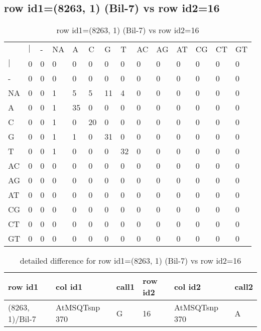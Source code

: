 \subsection{row id1=(8263, 1) (Bil-7) vs row id2=16}
\begin{center}
\begin{longtable}{|l|l|l|l|l|l|l|l|l|l|l|l|l|l|}
\caption{row id1=(8263, 1) (Bil-7) vs row id2=16} \label{table_dm412}\\
\hline
\\
\hline
&$|$&-&NA&A&C&G&T&AC&AG&AT&CG&CT&GT\\
$|$&0&0&0&0&0&0&0&0&0&0&0&0&0\\
-&0&0&0&0&0&0&0&0&0&0&0&0&0\\
NA&0&0&1&5&5&11&4&0&0&0&0&0&0\\
A&0&0&1&35&0&0&0&0&0&0&0&0&0\\
C&0&0&1&0&20&0&0&0&0&0&0&0&0\\
G&0&0&1&1&0&31&0&0&0&0&0&0&0\\
T&0&0&1&0&0&0&32&0&0&0&0&0&0\\
AC&0&0&0&0&0&0&0&0&0&0&0&0&0\\
AG&0&0&0&0&0&0&0&0&0&0&0&0&0\\
AT&0&0&0&0&0&0&0&0&0&0&0&0&0\\
CG&0&0&0&0&0&0&0&0&0&0&0&0&0\\
CT&0&0&0&0&0&0&0&0&0&0&0&0&0\\
GT&0&0&0&0&0&0&0&0&0&0&0&0&0\\
\hline
\end{longtable}
\end{center}

\begin{center}
\begin{longtable}{|l|l|l|l|l|l|}
\caption{detailed difference for row id1=(8263, 1) (Bil-7) vs row id2=16} \label{table_dm413}\\
\hline
row id1&col id1&call1&row id2&col id2&call2\\
\hline
(8263, 1)/Bil-7&AtMSQTsnp 370&G&16&AtMSQTsnp 370&A\\
\hline
\end{longtable}
\end{center}

